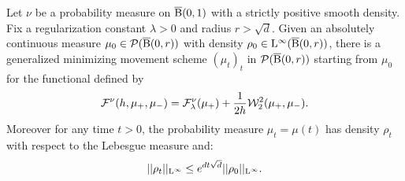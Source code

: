 \begin{thm} \label{thm:existance_gmm_scheme}
Let $\nu$ be a probability measure on $\operatorname{\overline{B}}(0,1)$ with a strictly positive smooth density. Fix a regularization constant $\lambda > 0$ and radius $r > \sqrt{d}$. Given an absolutely continuous measure $\mu_0 \in \mathcal{P}(\operatorname{\overline{B}}(0,r))$ with density $\rho_0 \in \mathrm{L}^{\infty}(\operatorname{\overline{B}}(0,r))$, there is a generalized minimizing movement scheme $(\mu_t)_t$ in $\mathcal{P}(\operatorname{\overline{B}}(0,r))$ starting from $\mu_0$ for the functional defined by 
\begin{equation} \label{gmm:sw_ent_functional}
\mathcal{F}^{\nu}(h, \mu_+, \mu_-) = \mathcal{F}^{\nu}_{\lambda}(\mu_+) + \frac{1}{2h}{\cal W}_2^2(\mu_+, \mu_-).
\end{equation}
Moreover for any time $t > 0$, the probability measure $\mu_t = \mu(t)$ has density $\rho_t$ with respect to the Lebesgue measure and:
\begin{equation}
  \label{eq:bound:existance_gmm_scheme}
||\rho_t||_{\mathrm{L}^{\infty}} \leq e^{d t\sqrt{d}} ||\rho_0||_{\mathrm{L}^{\infty}} .  
\end{equation}
\end{thm}
